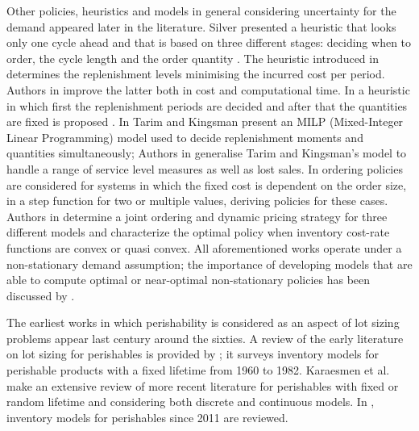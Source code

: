 Other policies, heuristics and models in general considering uncertainty for the demand appeared later in the literature. Silver  presented a heuristic that looks only one cycle ahead and that is based on three different stages: deciding when to order, the cycle length and the order quantity \cite{citeulike:7292564}. The heuristic introduced in \cite{Askin} determines the replenishment levels minimising the incurred cost per period. Authors in \cite{Bollapragada:1999} improve the latter both in cost and computational time. In \cite{BookbinderandTan} a heuristic in which first the replenishment periods are decided and after that the quantities are fixed is  proposed . In \cite{citeulike:12317242} Tarim and Kingsman present an MILP (Mixed-Integer Linear Programming) model used to decide replenishment moments and quantities simultaneously; Authors in \cite{citeulike:13341691} generalise Tarim and Kingsman's model to handle a range of service level measures as well as lost sales.
In \cite{doi:10.1287/opre.1110.1033} ordering policies are considered for systems in which the fixed cost is dependent on the order size, in a step function for two or multiple values, deriving policies for these cases. Authors in \cite{doi:10.1287/opre.2013.1238} determine a joint ordering and dynamic pricing strategy for three different models and characterize the optimal policy when inventory cost-rate functions are convex or quasi convex.
All aforementioned works operate under a non-stationary demand assumption; the importance of developing models that are able to compute optimal or near-optimal non-stationary policies has been discussed by \cite{citeulike:7928534}.

The earliest works in which perishability is considered as an aspect of lot sizing problems appear last century around the sixties. A review of the early literature on lot sizing for perishables is provided by \cite{Nahmias82}; it surveys inventory models for perishable products with a fixed lifetime from 1960 to 1982. Karaesmen et al. \cite{KaraesmenEtal11} make an extensive review of more recent literature for perishables with fixed or random lifetime and considering both discrete and continuous models. In \cite{Bakker12}, inventory models for perishables since 2011 are reviewed.

